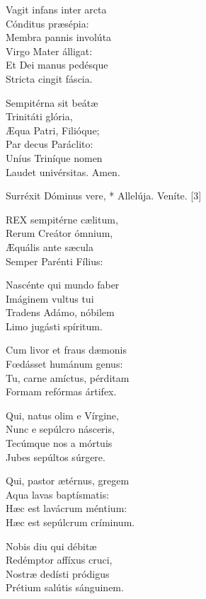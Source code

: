 Vagit infans inter arcta\\
Cónditus præsépia:\\
Membra pannis involúta\\
Virgo Mater álligat:\\
Et Dei manus pedésque\\
Stricta cingit fáscia.

Sempitérna sit beátæ\\
Trinitáti glória,\\
Æqua Patri, Filióque;\\
Par decus Paráclito:\\
Uníus Triníque nomen\\
Laudet univérsitas. Amen.


 Surréxit Dóminus vere, * Allelúja.  Veníte. [3]


\lettrine[lines=2]{R}{EX} sempitérne cælitum,\\
Rerum Creátor ómnium,\\
Æquális ante sæcula\\
Semper Parénti Fílius:

Nascénte qui mundo faber\\
Imáginem vultus tui\\
Tradens Adámo, nóbilem\\
Limo jugásti spíritum.

Cum livor et fraus dæmonis\\
Fœdásset humánum genus:\\
Tu, carne amíctus, pérditam\\
Formam refórmas ártifex.

Qui, natus olim e Vírgine,\\
Nunc e sepúlcro násceris,\\
Tecúmque nos a mórtuis\\
Jubes sepúltos súrgere.

Qui, pastor ætérnus, gregem\\
Aqua lavas baptísmatis:\\
Hæc est lavácrum méntium:\\
Hæc est sepúlcrum críminum.

Nobis diu qui débitæ\\
Redémptor affíxus cruci,\\
Nostræ dedísti pródigus\\
Prétium salútis sánguinem.

